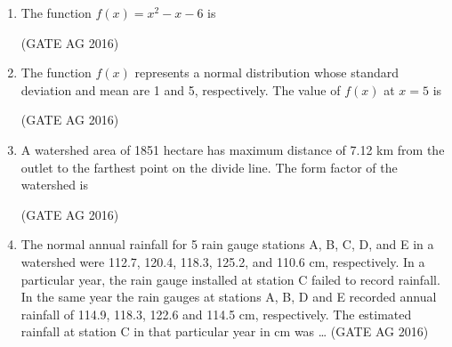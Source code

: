 \documentclass[journal]{IEEEtran}
\begin{document}
\begin{enumerate}
\medskip

\item 
The function $f(x) = x^2 - x - 6$ is
\begin{enumerate}
\end{enumerate}
\hfill(GATE AG 2016)\\

\medskip

\item 
The function $f(x)$ represents a normal distribution whose standard deviation and mean are 1 and 5, respectively. The value of $f(x)$ at $x = 5$ is
\begin{enumerate}
\end{enumerate}
\hfill(GATE AG 2016)\\

\medskip

\item 
A watershed area of 1851 hectare has maximum distance of 7.12 km from the outlet to the farthest point on the divide line. The form factor of the watershed is
\begin{enumerate}
\end{enumerate}
\hfill(GATE AG 2016)\\

\medskip

\item 
The normal annual rainfall for 5 rain gauge stations A, B, C, D, and E in a watershed were 112.7, 120.4, 118.3, 125.2, and 110.6 cm, respectively. In a particular year, the rain gauge installed at station C failed to record rainfall. In the same year the rain gauges at stations A, B, D and E recorded annual rainfall of 114.9, 118.3, 122.6 and 114.5 cm, respectively. The estimated rainfall at station C in that particular year in cm was \dots
\hfill(GATE AG 2016)\\


\end{enumerate}
\end{document}
